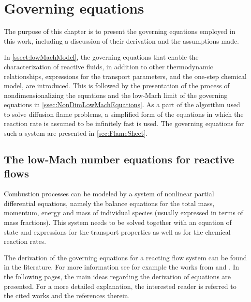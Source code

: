 \chapter{Governing equations}	\label{ch:gov_eqs}
The purpose of this chapter is to present the governing equations employed in this work, including a discussion of their derivation and the assumptions made.

In \cref{ssect:lowMachModel}, the governing equations that enable the characterization of reactive fluids, in addition to other thermodynamic relationships, expressions for the transport parameters, and the one-step chemical model, are introduced. This is followed by the presentation of the process of nondimensionalizing the equations and the low-Mach limit of the governing equations in \cref{ssec:NonDimLowMachEquations}.  As a part of the algorithm used to solve diffusion flame problems, a simplified form of the equations in which the reaction rate is assumed to be infinitely fast is used. The governing equations for such a system are presented in \cref{sec:FlameSheet}.

\section{The low-Mach number equations for reactive flows} \label{sec:GovEqLowMach}
Combustion processes can be modeled by a system of nonlinear partial differential equations, namely the balance equations for the total mass, momentum, energy and mass of individual species (usually expressed in terms of mass fractions). This system needs to be solved together with an equation of state and expressions for the transport properties as well as for the chemical reaction rates.

The derivation of the governing equations for a reacting flow system can be found in the literature. For more information see for example the works from \textcite{keeChemicallyReactingFlow2003} and \textcite{poinsotTheoreticalNumericalCombustion2011}. In the following pages, the main ideas regarding the derivation of equations are presented. For a more detailed explanation,  the interested reader is referred to the cited works and the references therein.

